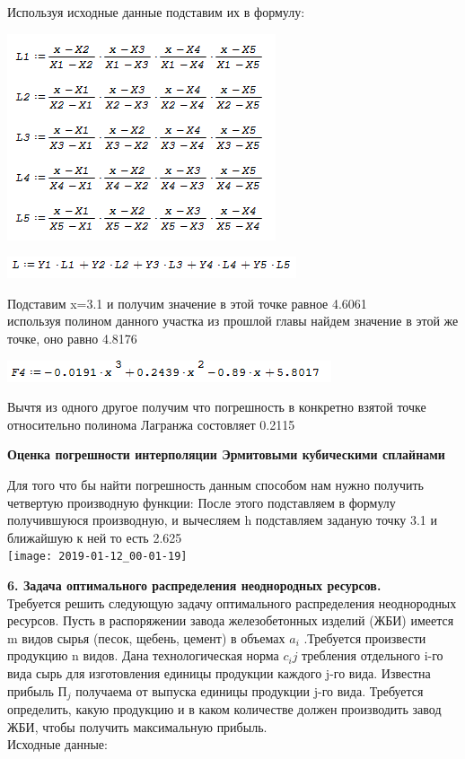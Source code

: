 \documentclass[russian,utf8,nocolumnxxxi,nocolumnxxxii]{eskdtext}
\begin{document}
{Используя исходные данные подставим их в формулу:
\begin{center}
\includegraphics[scale=0.7]{2019-01-11_01-38-55}
\end{center}

\begin{center}
\includegraphics[scale=0.7]{2019-01-11_01-39-59}
\end{center}
Подставим x=3.1 и получим значение в этой точке равное 4.6061
\\используя полином данного участка из прошлой главы найдем значение в этой же точке, оно равно 4.8176

\begin{center}
\includegraphics[scale=0.7]{2019-01-11_01-41-56}
\end{center}
Вычтя из одного другое получим что погрешность в конкретно взятой точке относительно полинома Лагранжа состовляет 0.2115
\par
\normalsize

\newpage

\begin{center}

{\bf Оценка погрешности интерполяции Эрмитовыми
кубическими сплайнами}

\end{center}
Для того что бы найти погрешность данным способом нам нужно получить четвертую производную функции:
После этого подставляем в формулу получившуюся производную, и вычесляем h подставляем заданую точку 3.1 и ближайшую к ней то есть 2.625
\\\texttt{[image: 2019-01-12\_00-01-19]}

\newpage
{\bf6. Задача оптимального распределения неоднородных ресурсов.}\\
Требуется решить следующую задачу оптимального распределения неоднородных ресурсов. Пусть в распоряжении завода железобетонных изделий (ЖБИ) имеется m видов сырья (песок, щебень, цемент) в объемах $ a_i$  .Требуется произвести продукцию n видов. Дана технологическая норма $c_ij$  требления отдельного i-го вида сырь для изготовления единицы продукции каждого j-го вида. Известна прибыль $П_j$  получаема от выпуска единицы продукции j-го вида. Требуется определить, какую продукцию и в каком количестве должен производить завод ЖБИ, чтобы получить максимальную прибыль.\\
Исходные данные:\\

}
\end{document}
